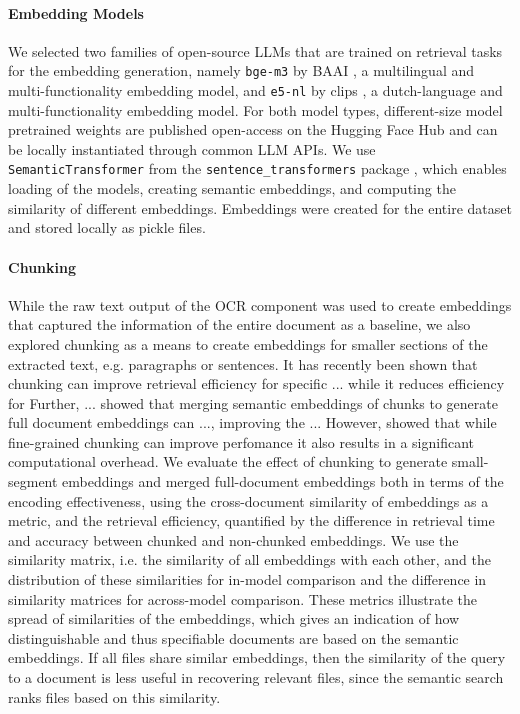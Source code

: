 \paragraph{Embedding Models} We selected two families of open-source LLMs that are trained on retrieval tasks for the embedding generation, namely \texttt{bge-m3} by BAAI \cite{chen2024bge}, a multilingual and multi-functionality embedding model, and \texttt{e5-nl} by clips \cite{banar2025mteb}, a dutch-language and multi-functionality embedding model.
For both model types, different-size model pretrained weights are published open-access on the Hugging Face Hub and can be locally instantiated through common LLM APIs.
We use \texttt{SemanticTransformer} from the \texttt{sentence_transformers} package \cite{reimers-2019-sentence-bert}, which enables loading of the models, creating semantic embeddings, and computing the similarity of different embeddings.
Embeddings were created for the entire dataset and stored locally as pickle files.

\paragraph{Chunking} While the raw text output of the OCR component was used to create embeddings that captured the information of the entire document as a baseline, we also explored chunking as a means to create embeddings for smaller sections of the extracted text, e.g. paragraphs or sentences. 
It has recently been shown that chunking can improve retrieval efficiency for specific ... while it reduces efficiency for \cite{zhouChunkThenEmbedComprehensiveTaxonomy2026}
Further, ... showed that merging semantic embeddings of chunks to generate full document embeddings can ..., improving the ... 
However, \textcite{jaiswalComparisonChunkingTechniques2025} showed that while fine-grained chunking can improve perfomance it also results in a significant computational overhead.
We evaluate the effect of chunking to generate small-segment embeddings and merged full-document embeddings both in terms of the encoding effectiveness, using the cross-document similarity of embeddings as a metric, and the retrieval efficiency, quantified by the difference in retrieval time and accuracy between chunked and non-chunked embeddings.
We use the similarity matrix, i.e. the similarity of all embeddings with each other, and the distribution of these similarities for in-model comparison and the difference in similarity matrices for across-model comparison.
These metrics illustrate the spread of similarities of the embeddings, which gives an indication of how distinguishable and thus specifiable documents are based on the semantic embeddings.
If all files share similar embeddings, then the similarity of the query to a document is less useful in recovering relevant files, since the semantic search ranks files based on this similarity.

